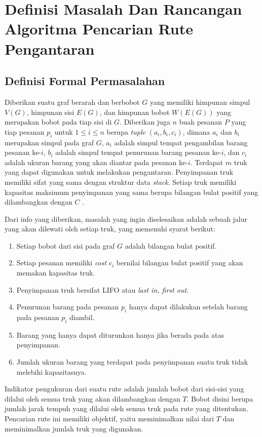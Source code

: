 \chapter{Definisi Masalah Dan Rancangan Algoritma Pencarian Rute Pengantaran}

\section{Definisi Formal Permasalahan}

Diberikan suatu graf berarah dan berbobot $G$ yang memiliki himpunan simpul $V(G)$, himpunan sisi
$E(G)$, dan himpunan bobot $W(E(G))$ yang merupakan bobot pada tiap sisi di $G$. Diberikan juga $n$
buah pesanan $P$ yang tiap pesanan $p_{i}$ untuk $1 \leq i \leq n$ berupa \textit{tuple} $(a_{i},
b_{i}, c_{i})$, dimana $a_{i}$ dan $b_{i}$ merupakan simpul pada graf $G$, $a_{i}$ adalah simpul
tempat pengambilan barang pesanan ke-$i$, $b_{i}$ adalah simpul tempat penurunan barang pesanan
ke-$i$, dan $c_{i}$ adalah ukuran barang yang akan diantar pada pesanan ke-$i$. Terdapat $m$ truk
yang dapat digunakan untuk melakukan pengantaran. Penyimpanan truk memiliki sifat yang sama dengan
struktur data \textit{stack}. Setiap truk memiliki kapasitas maksimum penyimpanan yang sama berupa
bilangan bulat positif yang dilambangkan dengan $C$ .

Dari info yang diberikan, masalah yang ingin diselesaikan adalah sebuah jalur yang akan 
dilewati oleh setiap truk, yang memenuhi syarat berikut:
\begin{enumerate}
  \item Setiap bobot dari sisi pada graf $G$ adalah bilangan bulat positif.
  \item Setiap pesanan memiliki \textit{cost} $c_{i}$ bernilai bilangan bulat positif yang akan
  memakan kapasitas truk.
  \item Penyimpanan truk bersifat LIFO atau \textit{last in, first out}.
  \item Penurunan barang pada pesanan $p_{i}$ hanya dapat dilakukan setelah barang pada pesanan
  $p_{i}$ diambil.
  \item Barang yang hanya dapat diturunkan hanya jika berada pada atas penyimpanan.
  \item Jumlah ukuran barang yang terdapat pada penyimpanan suatu truk tidak melebihi kapasitasnya.
\end{enumerate}

Indikator pengukuran dari suatu rute adalah jumlah bobot dari sisi-sisi yang dilalui oleh semua truk
yang akan dilambangkan dengan $T$. Bobot disini berupa jumlah jarak tempuh yang dilalui oleh semua
truk pada rute yang ditentukan. Pencarian rute ini memiliki objektif, yaitu meminimalkan nilai
dari $T$ dan meminimalkan jumlah truk yang digunakan.

